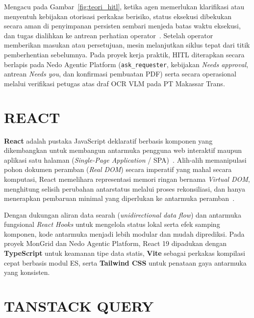 Mengacu pada Gambar~\ref{fig:teori_hitl}, ketika agen memerlukan klarifikasi atau menyentuh kebijakan otorisasi perkakas berisiko, status eksekusi dibekukan secara aman di penyimpanan persisten sembari menjeda batas waktu eksekusi, dan tugas dialihkan ke antrean perhatian operator~\cite{mosqueira2023human}. Setelah operator memberikan masukan atau persetujuan, mesin melanjutkan siklus tepat dari titik pemberhentian sebelumnya. Pada proyek kerja praktik, HITL diterapkan secara berlapis pada Nedo Agentic Platform (\texttt{ask\_requester}, kebijakan \textit{Needs approval}, antrean \textit{Needs you}, dan konfirmasi pembuatan PDF) serta secara operasional melalui verifikasi petugas atas draf OCR VLM pada PT Makassar Trans.

\section{REACT}

\textbf{React} adalah pustaka JavaScript deklaratif berbasis komponen yang dikembangkan untuk membangun antarmuka pengguna web interaktif maupun aplikasi satu halaman (\textit{Single-Page Application} / SPA)~\cite{react_doc}. Alih-alih memanipulasi pohon dokumen peramban (\textit{Real DOM}) secara imperatif yang mahal secara komputasi, React memelihara representasi memori ringan bernama \textit{Virtual DOM}, menghitung selisih perubahan antarstatus melalui proses rekonsiliasi, dan hanya menerapkan pembaruan minimal yang diperlukan ke antarmuka peramban~\cite{react_doc}.

Dengan dukungan aliran data searah (\textit{unidirectional data flow}) dan antarmuka fungsional \textit{React Hooks} untuk mengelola status lokal serta efek samping komponen, kode antarmuka menjadi lebih modular dan mudah diprediksi. Pada proyek MonGrid dan Nedo Agentic Platform, React 19 dipadukan dengan \textbf{TypeScript} untuk keamanan tipe data statis, \textbf{Vite} sebagai perkakas kompilasi cepat berbasis modul ES, serta \textbf{Tailwind CSS} untuk penataan gaya antarmuka yang konsisten.

\section{TANSTACK QUERY}

